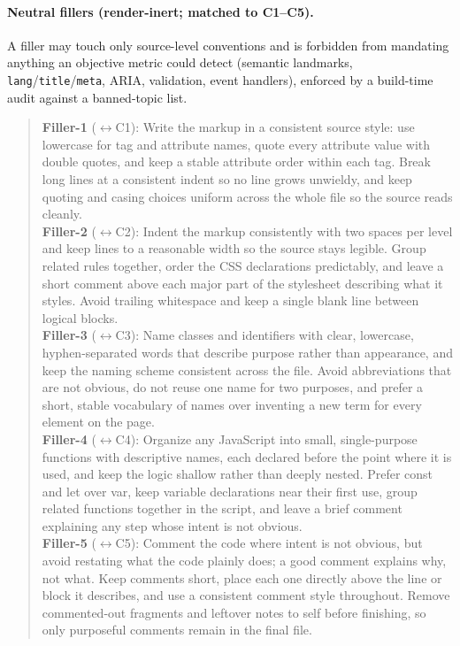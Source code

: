 \paragraph{Neutral fillers (render-inert; matched to C1--C5).} A filler may touch only source-level
conventions and is forbidden from mandating anything an objective metric could detect (semantic
landmarks, \texttt{lang}/\texttt{title}/\texttt{meta}, ARIA, validation, event handlers), enforced by a
build-time audit against a banned-topic list.
\begin{quote}\small
\textbf{Filler-1} ($\leftrightarrow$C1): Write the markup in a consistent source style: use lowercase
for tag and attribute names, quote every attribute value with double quotes, and keep a stable attribute
order within each tag. Break long lines at a consistent indent so no line grows unwieldy, and keep
quoting and casing choices uniform across the whole file so the source reads cleanly.\\[2pt]
\textbf{Filler-2} ($\leftrightarrow$C2): Indent the markup consistently with two spaces per level and
keep lines to a reasonable width so the source stays legible. Group related rules together, order the CSS
declarations predictably, and leave a short comment above each major part of the stylesheet describing
what it styles. Avoid trailing whitespace and keep a single blank line between logical blocks.\\[2pt]
\textbf{Filler-3} ($\leftrightarrow$C3): Name classes and identifiers with clear, lowercase,
hyphen-separated words that describe purpose rather than appearance, and keep the naming scheme
consistent across the file. Avoid abbreviations that are not obvious, do not reuse one name for two
purposes, and prefer a short, stable vocabulary of names over inventing a new term for every element on
the page.\\[2pt]
\textbf{Filler-4} ($\leftrightarrow$C4): Organize any JavaScript into small, single-purpose functions
with descriptive names, each declared before the point where it is used, and keep the logic shallow
rather than deeply nested. Prefer const and let over var, keep variable declarations near their first
use, group related functions together in the script, and leave a brief comment explaining any step whose
intent is not obvious.\\[2pt]
\textbf{Filler-5} ($\leftrightarrow$C5): Comment the code where intent is not obvious, but avoid
restating what the code plainly does; a good comment explains why, not what. Keep comments short, place
each one directly above the line or block it describes, and use a consistent comment style throughout.
Remove commented-out fragments and leftover notes to self before finishing, so only purposeful comments
remain in the final file.
\end{quote}

